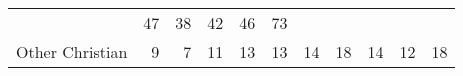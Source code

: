 \documentclass[]{article}
\begin{document}
\begin{longtable}[]{@{}lrrrrrrrrrr@{}}
\begin{minipage}[t]{0.05\columnwidth}
\end{minipage} & \begin{minipage}[t]{0.05\columnwidth}\raggedleft\strut
47\strut
\end{minipage} & \begin{minipage}[t]{0.06\columnwidth}\raggedleft\strut
38\strut
\end{minipage} & \begin{minipage}[t]{0.06\columnwidth}\raggedleft\strut
42\strut
\end{minipage} & \begin{minipage}[t]{0.04\columnwidth}\raggedleft\strut
46\strut
\end{minipage} & \begin{minipage}[t]{0.11\columnwidth}\raggedleft\strut
73\strut
\end{minipage}\tabularnewline
\begin{minipage}[t]{0.14\columnwidth}\raggedright\strut
Other Christian\strut
\end{minipage} & \begin{minipage}[t]{0.04\columnwidth}\raggedleft\strut
9\strut
\end{minipage} & \begin{minipage}[t]{0.05\columnwidth}\raggedleft\strut
7\strut
\end{minipage} & \begin{minipage}[t]{0.05\columnwidth}\raggedleft\strut
11\strut
\end{minipage} & \begin{minipage}[t]{0.05\columnwidth}\raggedleft\strut
13\strut
\end{minipage} & \begin{minipage}[t]{0.05\columnwidth}\raggedleft\strut
13\strut
\end{minipage} & \begin{minipage}[t]{0.05\columnwidth}\raggedleft\strut
14\strut
\end{minipage} & \begin{minipage}[t]{0.06\columnwidth}\raggedleft\strut
18\strut
\end{minipage} & \begin{minipage}[t]{0.06\columnwidth}\raggedleft\strut
14\strut
\end{minipage} & \begin{minipage}[t]{0.04\columnwidth}\raggedleft\strut
12\strut
\end{minipage} & \begin{minipage}[t]{0.11\columnwidth}\raggedleft\strut
18\strut

\end{minipage}
\end{longtable}
\end{document}
